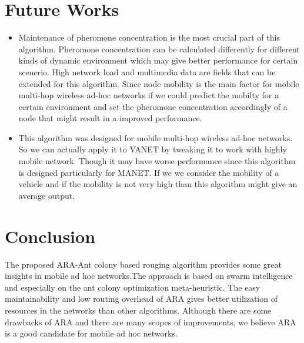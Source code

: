 \section{Future Works}
\begin{itemize}

\item Maintenance of pheromone concentration is the most crucial part of this algorithm. Pheromone concentration can be calculated differently for different kinds of dynamic environment which may give better performance for certain scenerio. High network load and multimedia data are fields that can be extended for this algorithm. Since node mobility is the main factor for mobile multi-hop wireless ad-hoc networks if we could predict the mobilty for a certain environment and set the pheromone concentration accordingly of a node that might result in a improved performance.

\item This algorithm was designed for mobile multi-hop wireless ad-hoc networks. So we can actually apply it to VANET by tweaking it to work with highly mobile network. Though it may have worse performance since this algorithm is designed particularly for MANET. If we we consider the mobility of a vehicle and if the mobility is not very high than this algorithm might give an average output.
\end{itemize}

\section{Conclusion}
The proposed ARA-Ant colony based rouging algorithm provides some great insights in mobile ad hoc networks.The approach is based on swarm intelligence and especially on the ant colony optimization meta-heuristic. The easy maintainability and low routing overhead of ARA gives better utilization of resources in the networks than other algorithms. Although there are some drawbacks of ARA and there are many scopes of improvements, we believe ARA is a good candidate for mobile ad hoc networks.





